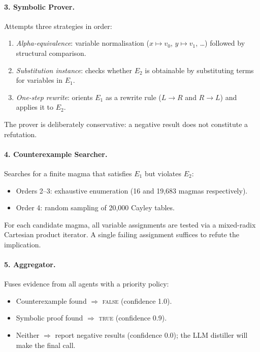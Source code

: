 \documentclass{article}
\begin{document}
\paragraph{3. Symbolic Prover.} Attempts three strategies in order:
\begin{enumerate}[label=(\alph*),itemsep=1pt]
  \item \textit{Alpha-equivalence}: variable normalisation ($x \mapsto v_0$, $y \mapsto v_1$, \dots) followed by structural comparison.
  \item \textit{Substitution instance}: checks whether $E_2$ is obtainable by substituting terms for variables in $E_1$.
  \item \textit{One-step rewrite}: orients $E_1$ as a rewrite rule ($L \to R$ and $R \to L$) and applies it to $E_2$.
\end{enumerate}
The prover is deliberately conservative: a negative result does not constitute a refutation.

\paragraph{4. Counterexample Searcher.} Searches for a finite magma that satisfies $E_1$ but violates $E_2$:
\begin{itemize}[itemsep=1pt]
  \item Orders 2--3: exhaustive enumeration (16 and 19,683 magmas respectively).
  \item Order 4: random sampling of 20,000 Cayley tables.
\end{itemize}
For each candidate magma, all variable assignments are tested via a mixed-radix Cartesian product iterator. A single failing assignment suffices to refute the implication.

\paragraph{5. Aggregator.} Fuses evidence from all agents with a priority policy:
\begin{itemize}[itemsep=1pt]
  \item Counterexample found $\Rightarrow$ \textsc{false} (confidence 1.0).
  \item Symbolic proof found $\Rightarrow$ \textsc{true} (confidence 0.9).
  \item Neither $\Rightarrow$ report negative results (confidence 0.0); the LLM distiller will make the final call.
\end{itemize}
\end{document}

